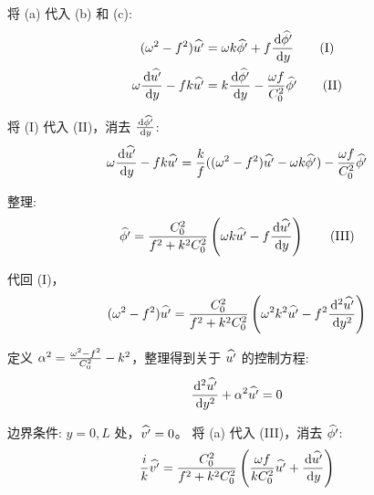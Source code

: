\begin{enumerate}
    将 (a) 代入 (b) 和 (c):
    \begin{align*}
        (\frequency^2 - \coriolis^2) \complexamp{u^\prime} &= \frequency k \complexamp{\gravpotential^\prime} + \coriolis \ode{\complexamp{\gravpotential^\prime}}{y} \tag{I} \\
        \frequency \ode{\complexamp{u^\prime}}{y} - \coriolis k \complexamp{u^\prime} &= k \ode{\complexamp{\gravpotential^\prime}}{y} - \frac{\frequency \coriolis}{C_0^2} \complexamp{\gravpotential^\prime} \tag{II} \\
    \end{align*}

    将 (I) 代入 (II)，消去 $\ode{\complexamp{\gravpotential^\prime}}{y}$:
    \begin{equation*}
        \frequency \ode{\complexamp{u^\prime}}{y} - \coriolis k \complexamp{u^\prime} = \frac{k}{\coriolis} ((\frequency^2 - \coriolis^2) \complexamp{u^\prime} - \frequency k \complexamp{\gravpotential^\prime}) - \frac{\frequency \coriolis}{C_0^2} \complexamp{\gravpotential^\prime}
    \end{equation*}

    整理:
    \begin{equation*}
        \complexamp{\gravpotential^\prime} = \frac{C_0^2}{\coriolis^2 + k^2 C_0^2} \left(\frequency k \complexamp{u^\prime} - \coriolis \ode{\complexamp{u^\prime}}{y}\right) \tag{III}
    \end{equation*}

    代回 (I)，
    \begin{equation*}
        (\frequency^2 - \coriolis^2) \complexamp{u^\prime} = \frac{C_0^2}{\coriolis^2 + k^2 C_0^2} \left(\frequency^2 k^2 \complexamp{u^\prime} - \coriolis^2 \ode[2]{\complexamp{u^\prime}}{y}\right)
    \end{equation*}

    定义 $\alpha^2 = \frac{\omega^2 - f^2}{C_0^2} - k^2$，整理得到关于 $\widehat{u^\prime}$ 的控制方程:
    \begin{equation*}
        \ode[2]{\complexamp{u^\prime}}{y} + \alpha^2 \complexamp{u^\prime} = 0
    \end{equation*}

    边界条件: $y = 0, L$ 处，$\widehat{v^\prime} = 0$。
    将 (a) 代入 (III)，消去 $\widehat{\phi^\prime}$:
    \begin{equation*}
        \frac{i}{k} \complexamp{v^\prime} = \frac{C_0^2}{\coriolis^2 + k^2 C_0^2} \left(\frac{\frequency \coriolis}{k C_0^2} \complexamp{u^\prime} + \ode{\complexamp{u^\prime}}{y}\right)
    \end{equation*}


\end{enumerate}
